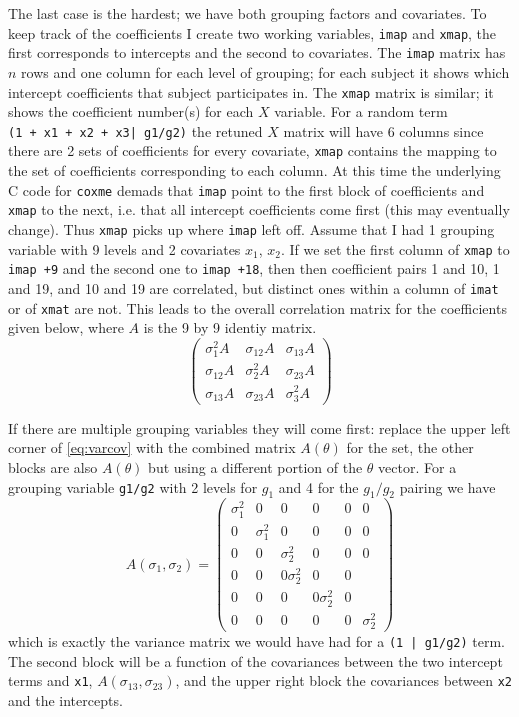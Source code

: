 \documentclass{article}
\begin{document}
The last case is the hardest; we have both grouping factors and
covariates.
To keep track of the coefficients I create two working variables,
{\tt{}imap} and {\tt{}xmap}, the first corresponds to intercepts
and the second to covariates.  
The {\tt{}imap} matrix has $n$ rows and one column for each level
of grouping; for each subject it shows which intercept coefficients
that subject participates in.
The {\tt{}xmap} matrix is similar; it shows the coefficient number(s) for
each $X$ variable.  
For a random term {\tt{}(1\ +\ x1\ +\ x2\ +\ x3|\ g1/g2)} the retuned $X$ matrix will
have 6 columns since there are 2 sets of coefficients for every covariate,
{\tt{}xmap} contains the mapping to the set of coefficients corresponding to each column.
At this time the underlying C code for {\tt{}coxme} demads that {\tt{}imap} point
to the first block of coefficients and {\tt{}xmap} to the next, i.e. that
all intercept coefficients come first (this may eventually change).
Thus {\tt{}xmap} picks up where {\tt{}imap} left off. 
Assume that I had 1 grouping variable with 9 levels and 2 covariates 
$x_1$, $x_2$.
If we set the first column of {\tt{}xmap} to {\tt{}imap\ +9} and the second
one to {\tt{}imap\ +18}, then then coefficient pairs 1 and 10, 1 and 19, and
10 and 19 are correlated, but distinct ones within a column of {\tt{}imat} or
of {\tt{}xmat} are not.  
This leads to the overall correlation matrix for the coefficients given
below, where $A$ is the 9 by 9 identiy matrix.
\begin{equation}
\left( \begin{array}{ccc}
  \sigma^2_1 A & \sigma_{12} A & \sigma_{13}A \\
  \sigma_{12}A & \sigma_2^2 A &  \sigma_{23}A \\
  \sigma_{13}A & \sigma_{23}A &  \sigma_3^2 A \end{array} \right)
\label{eq:varcov}
\end{equation}

If there are multiple grouping variables they will come first:
replace the upper left corner of \ref{eq:varcov} with the 
combined matrix $A(\theta)$ for the set, the other blocks are also
$A(\theta)$ but using a different portion of the $\theta$ vector.
For a grouping variable {\tt{}g1/g2} with 2 levels for $g_1$ and 4 for the $g_1/g_2$
pairing we have
$$
A(\sigma_1, \sigma_2) = \left( \begin{array}{cccccc}
  \sigma_1^2& 0&0&0&0&0 \\
  0&\sigma_1^2&0&0&0&0 \\
  0&0&\sigma_2^2&0&0&0 \\
  0&0&0 \sigma_2^2 &0&0 \\
  0&0&0&0 \sigma_2^2&0 \\
  0&0&0&0&0& \sigma_2^2 \end{array} \right)
$$
which is exactly the variance matrix we would have had for a {\tt{}(1\ |\ g1/g2)}
term.
The second block will be a function of the covariances between the two intercept
terms and {\tt{}x1}, $A(\sigma_{13}, \sigma_{23})$, and the upper right block the
covariances between {\tt{}x2} and the intercepts.
\end{document}
